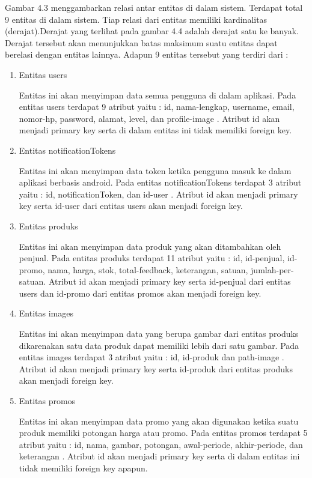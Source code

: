 \begin{enumerate}
		Gambar 4.3 menggambarkan relasi antar entitas di dalam sistem. Terdapat total 9 entitas di dalam sistem. Tiap relasi dari entitas memiliki kardinalitas (derajat).Derajat yang terlihat pada gambar 4.4 adalah derajat satu ke banyak. Derajat tersebut akan menunjukkan batas maksimum suatu entitas dapat berelasi dengan entitas lainnya. Adapun 9 entitas tersebut yang terdiri dari :

		\begin{enumerate}
			\item Entitas users
			\par Entitas ini akan menyimpan data semua pengguna di dalam aplikasi. Pada
			entitas users terdapat 9 atribut yaitu : id, nama-lengkap, username, email,
			nomor-hp, password, alamat, level, dan profile-image . Atribut id akan
			menjadi primary key serta di dalam entitas ini tidak memiliki foreign key.
			\item Entitas notificationTokens
			\par Entitas ini akan menyimpan data token ketika pengguna masuk ke dalam
			aplikasi berbasis android. Pada entitas notificationTokens terdapat 3 atribut
			yaitu : id, notificationToken, dan id-user . Atribut id akan menjadi primary
			key serta id-user dari entitas users akan menjadi foreign key.
			\item Entitas produks
			\par Entitas ini akan menyimpan data produk yang akan ditambahkan oleh penjual. Pada entitas produks terdapat 11 atribut yaitu : id, id-penjual, id-promo, nama, harga, stok, total-feedback, keterangan, satuan, jumlah-per-satuan. Atribut id akan menjadi primary key serta id-penjual dari entitas users dan id-promo dari entitas promos akan menjadi foreign key.
			\item Entitas images
			\par Entitas ini akan menyimpan data yang berupa gambar dari entitas produks dikarenakan satu data produk dapat memiliki lebih dari satu gambar. Pada
			entitas images terdapat 3 atribut yaitu : id, id-produk dan path-image . Atribut id akan menjadi primary key serta id-produk dari entitas produks akan menjadi foreign key.
			\item Entitas promos
			\par Entitas ini akan menyimpan data promo yang akan digunakan ketika suatu produk memiliki potongan harga atau promo. Pada entitas promos terdapat 5 atribut yaitu : id, nama, gambar, potongan, awal-periode, akhir-periode, dan
			keterangan . Atribut id akan menjadi primary key serta di dalam entitas ini tidak memiliki foreign key apapun.

\end{enumerate}
\end{enumerate}
